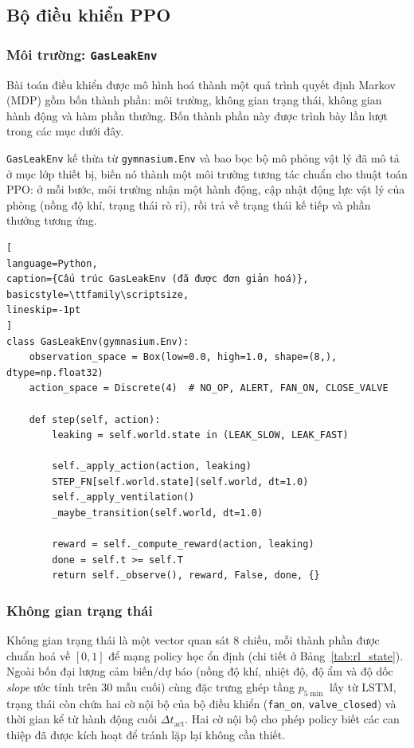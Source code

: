 \subsection{Bộ điều khiển PPO}

\subsubsection*{Môi trường: \texttt{GasLeakEnv}}

Bài toán điều khiển được mô hình hoá thành một quá trình quyết định Markov (MDP) gồm bốn thành phần: môi trường, không gian trạng thái, không gian hành động và hàm phần thưởng. Bốn thành phần này được trình bày lần lượt trong các mục dưới đây.

\texttt{GasLeakEnv} kế thừa từ \texttt{gymnasium.Env} và bao bọc bộ mô phỏng vật lý đã mô tả ở mục lớp thiết bị, biến nó thành một môi trường tương tác chuẩn cho thuật toán PPO: ở mỗi bước, môi trường nhận một hành động, cập nhật động lực vật lý của phòng (nồng độ khí, trạng thái rò rỉ), rồi trả về trạng thái kế tiếp và phần thưởng tương ứng.

\Needspace{0.62\textheight}
\begin{lstlisting}[
language=Python,
caption={Cấu trúc GasLeakEnv (đã được đơn giản hoá)},
basicstyle=\ttfamily\scriptsize,
lineskip=-1pt
]
class GasLeakEnv(gymnasium.Env):
    observation_space = Box(low=0.0, high=1.0, shape=(8,), dtype=np.float32)
    action_space = Discrete(4)  # NO_OP, ALERT, FAN_ON, CLOSE_VALVE

    def step(self, action):
        leaking = self.world.state in (LEAK_SLOW, LEAK_FAST)

        self._apply_action(action, leaking)
        STEP_FN[self.world.state](self.world, dt=1.0)
        self._apply_ventilation()
        _maybe_transition(self.world, dt=1.0)

        reward = self._compute_reward(action, leaking)
        done = self.t >= self.T
        return self._observe(), reward, False, done, {}
\end{lstlisting}

\subsubsection*{Không gian trạng thái}

Không gian trạng thái là một vector quan sát 8 chiều, mỗi thành phần được chuẩn hoá về $[0,1]$ để mạng policy học ổn định (chi tiết ở Bảng~\ref{tab:rl_state}). Ngoài bốn đại lượng cảm biến/dự báo (nồng độ khí, nhiệt độ, độ ẩm và độ dốc \textit{slope} ước tính trên 30 mẫu cuối) cùng đặc trưng ghép tầng $p_{5\min}$ lấy từ LSTM, trạng thái còn chứa hai cờ nội bộ của bộ điều khiển (\texttt{fan\_on}, \texttt{valve\_closed}) và thời gian kể từ hành động cuối $\Delta t_{\mathrm{act}}$. Hai cờ nội bộ cho phép policy biết các can thiệp đã được kích hoạt để tránh lặp lại không cần thiết.

